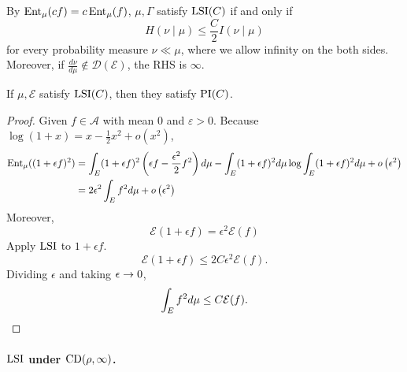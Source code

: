 By $\operatorname{Ent}_\mu(cf) = c\operatorname{Ent}_\mu(f)$, $\mu, \Gamma$ satisfy $\operatorname{LSI}(C)$ if and only if
\begin{equation*}
    H(\nu \mid \mu) \leq \frac{C}{2}I(\nu \mid \mu)
\end{equation*}
for every probability measure $\nu \ll \mu$, where we allow infinity on the both sides. Moreover, if $\frac{d \nu}{d \mu} \notin \mathcal{D}(\mathcal{E})$, the RHS is $\infty$.

\begin{prop}
    If $\mu,\mathcal{E}$ satisfy $\operatorname{LSI}(C)$, then they satisfy $\operatorname{PI}(C)$.
\end{prop}
\begin{proof}
    Given $f \in \mathcal{A}$ with mean $0$ and $\varepsilon > 0$. Because $\log(1 + x) = x -\frac{1}{2}x^2 + o(x^2)$,
    \begin{align*}
        \operatorname{Ent}_\mu((1 + \epsilon f)^2) &= \int_E(1+\epsilon f)^2\left(\epsilon f-\frac{\epsilon^2}{2} f^2\right) d \mu-\int_E(1+\epsilon f)^2 d \mu \log \int_E(1+\epsilon f)^2 d \mu+o\left(\epsilon^2\right) \\
        &= 2 \epsilon^2 \int_E f^2 d \mu+o\left(\epsilon^2\right)
    \end{align*}
    Moreover,
    \begin{equation*}
        \mathcal{E}(1+\epsilon f) = \epsilon^2\mathcal{E}(f)
    \end{equation*}
    Apply $\operatorname{LSI}$ to $1 + \epsilon f$.
    \begin{equation*}
        \mathcal{E}(1+\epsilon f) \leq 2C \epsilon^2\mathcal{E}(f).
    \end{equation*}
    Dividing $\epsilon$ and taking $\epsilon \rightarrow 0$,
    \begin{equation*}
        \int_E f^2 d \mu \leq C \mathcal{E}(f). \qedhere
    \end{equation*}
\end{proof}

\paragraph{$\operatorname{LSI}$ under $\operatorname{CD}(\rho,\infty)$.}

